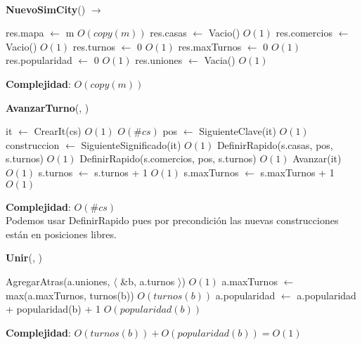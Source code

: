 ~

\begin{Algoritmos}

\begin{algorithm}[H]{\textbf{NuevoSimCity}() $\to$ }
\begin{algorithmic}[1]
    \State res.mapa $\gets$ m \Comment $O(copy(m))$
    \State res.casas $\gets$ Vacio() \Comment $O(1)$
    \State res.comercios $\gets$ Vacio() \Comment $O(1)$
    \State res.turnos $\gets$ 0 \Comment $O(1)$
    \State res.maxTurnos $\gets$ 0 \Comment $O(1)$
    \State res.popularidad $\gets$ 0 \Comment $O(1)$
    \State res.uniones $\gets$ Vacia() \Comment $O(1)$
\end{algorithmic}
\textbf{Complejidad}: $O(copy(m))$
\end{algorithm}

\begin{algorithm}[H]{\textbf{AvanzarTurno}(, )}
\begin{algorithmic}[1]
    \State it $\gets$ CrearIt(cs) \Comment $O(1)$
     \Comment $O(\#cs)$
        \State pos $\gets$ SiguienteClave(it) \Comment $O(1)$
        \State construccion $\gets$ SiguienteSignificado(it) \Comment $O(1)$
            \State DefinirRapido(s.casas, pos, s.turnos) \Comment $O(1)$
            \State DefinirRapido(s.comercios, pos, s.turnos) \Comment $O(1)$
        \EndIf
        \State Avanzar(it) \Comment $O(1)$
    \EndWhile
    \State s.turnos $\gets$ s.turnos + 1 \Comment $O(1)$
    \State s.maxTurnos $\gets$ s.maxTurnos + 1 \Comment $O(1)$
\end{algorithmic}
\textbf{Complejidad}: $O(\#cs)$ \\
Podemos usar DefinirRapido pues por precondición las nuevas construcciones están en posiciones libres.
\end{algorithm}

\begin{algorithm}[H]{\textbf{Unir}(, )}
\begin{algorithmic}[1]
    \State AgregarAtras(a.uniones, $\langle$ \&b, a.turnos $\rangle$) \Comment $O(1)$
    \State a.maxTurnos $\gets$ max(a.maxTurnos, turnos(b)) \Comment $O(turnos(b))$
    \State a.popularidad $\gets$ a.popularidad + popularidad(b) + 1 \Comment $O(popularidad(b))$
\end{algorithmic}
\textbf{Complejidad}: $O(turnos(b)) + O(popularidad(b)) = O(1)$
\end{algorithm}


\end{Algoritmos}
